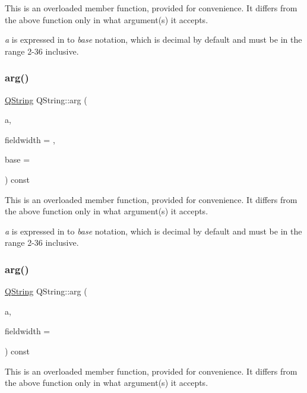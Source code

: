 This is an overloaded member function, provided for convenience. It differs from the above function only in what argument(s) it accepts.

{\itshape a} is expressed in to {\itshape base} notation, which is decimal by default and must be in the range 2-\/36 inclusive. \mbox{\label{class_q_string_a16bc2c0a1d3e66872697a0d772aac0cf}} 
\subsubsection{\texorpdfstring{arg()}{arg()}\hspace{0.1cm}{\footnotesize\ttfamily [5/10]}}
{\footnotesize\ttfamily \mbox{\hyperlink{class_q_string}{Q\+String}} Q\+String\+::arg (\begin{DoxyParamCaption}\item[{long}]{a,  }\item[{int}]{fieldwidth = {},  }\item[{int}]{base = {} }\end{DoxyParamCaption}) const}

This is an overloaded member function, provided for convenience. It differs from the above function only in what argument(s) it accepts.

{\itshape a} is expressed in to {\itshape base} notation, which is decimal by default and must be in the range 2-\/36 inclusive. \mbox{\label{class_q_string_a740e64a8e6502d50572c63b789ee73e7}} 
\subsubsection{\texorpdfstring{arg()}{arg()}\hspace{0.1cm}{\footnotesize\ttfamily [6/10]}}
{\footnotesize\ttfamily \mbox{\hyperlink{class_q_string}{Q\+String}} Q\+String\+::arg (\begin{DoxyParamCaption}\item[{\mbox{\hyperlink{class_q_char}{Q\+Char}}}]{a,  }\item[{int}]{fieldwidth = {} }\end{DoxyParamCaption}) const}

This is an overloaded member function, provided for convenience. It differs from the above function only in what argument(s) it accepts. \mbox{\label{class_q_string_a96b851d9db810c260225311bd1a1f1dc}} 
